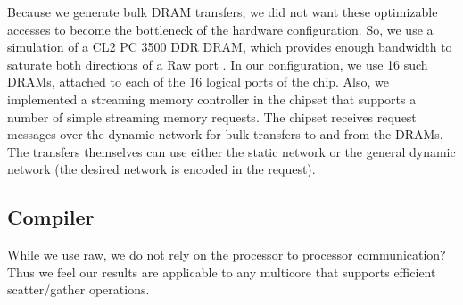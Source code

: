 Because we generate bulk DRAM transfers, we did not want these
optimizable accesses to become the bottleneck of the hardware
configuration.  So, we use a simulation of a CL2 PC 3500 DDR DRAM,
which provides enough bandwidth to saturate both directions of a Raw
port \cite{raw_isca}.  In our configuration, we use 16 such DRAMs,
attached to each of the 16 logical ports of the chip.  Also, we
implemented a streaming memory controller in the chipset that supports
a number of simple streaming memory requests.  The chipset receives
request messages over the dynamic network for bulk transfers to and
from the DRAMs.  The transfers themselves can use either the static
network or the general dynamic network (the desired network is encoded
in the request).  

\subsection{Compiler}

While we use raw, we do not rely on the processor to processor
communication?
Thus we feel our results are applicable to any multicore that supports
efficient scatter/gather operations.  